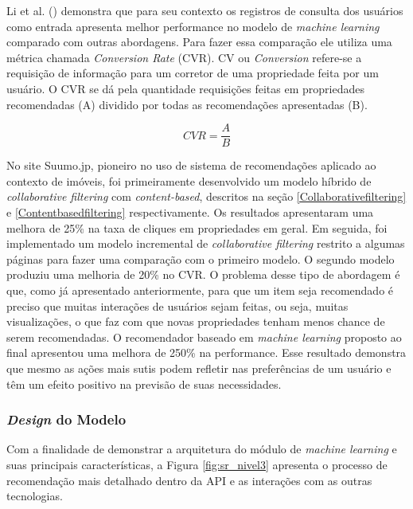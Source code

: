 Li et al. (\citeyear{Summo:2017}) demonstra que para seu contexto os registros de consulta dos usuários como entrada apresenta melhor performance no modelo de \textit{machine learning} comparado com outras abordagens. Para fazer essa comparação ele utiliza uma métrica chamada \textit{Conversion Rate} (CVR). CV ou \textit{Conversion} refere-se a requisição de informação para um corretor de uma propriedade feita por um usuário. O CVR se dá pela quantidade requisições feitas em propriedades recomendadas (A) dividido por todas as recomendações apresentadas (B).

\begin{equation}
    CVR=\frac{A}{B}
\end{equation}

No site Suumo.jp, pioneiro no uso de sistema de recomendações aplicado ao contexto de imóveis, foi primeiramente desenvolvido um modelo híbrido de \textit{collaborative filtering} com \textit{content-based}, descritos na seção \ref{Collaborativefiltering} e \ref{Contentbasedfiltering} respectivamente. Os resultados apresentaram uma melhora de 25\% na taxa de cliques em propriedades em geral. Em seguida, foi implementado um modelo incremental de \textit{collaborative filtering} restrito a algumas páginas para fazer uma comparação com o primeiro modelo. O segundo modelo produziu uma melhoria de 20\% no CVR. O problema desse tipo de abordagem é que, como já apresentado anteriormente, para que um item seja recomendado é preciso que muitas interações de usuários sejam feitas, ou seja, muitas visualizações, o que faz com que novas propriedades tenham menos chance de serem recomendadas. O recomendador baseado em \textit{machine learning} proposto ao final apresentou uma melhora de 250\% na performance. Esse resultado demonstra que mesmo as ações mais sutis podem refletir nas preferências de um usuário e têm um efeito positivo na previsão de suas necessidades.

\subsubsection{\textit{Design} do Modelo}

Com a finalidade de demonstrar a arquitetura do módulo de \textit{machine learning} e suas principais características, a Figura \ref{fig:sr_nivel3} apresenta o processo de recomendação mais detalhado dentro da API e as interações com as outras tecnologias.

